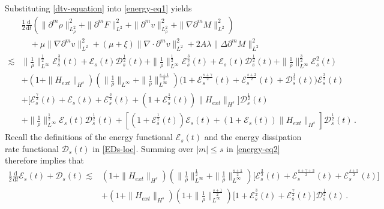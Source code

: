 \documentclass[reqno,11pt]{amsart}
\numberwithin{equation}{section}
\def\d{\mathrm{d}}
\begin{document}
Substituting \eqref{dtv-equation} into \eqref{energy-eq1} yields
\begin{equation}\label{energy-eq2}
	\begin{aligned}
	& \frac{1}{2}\frac{\d}{\d t}\left(\|\partial^m \rho\|_{L^2_\rho}^2 + \|\partial^m F\|_{L^2}^2 + \|\partial^m v\|_{L^2_\rho}^2 + \|\nabla \partial^m M\|_{L^2}^2\right) \\
& \quad + \mu \|\nabla \partial^m v\|_{L^2}^2 + (\mu + \xi) \|\nabla \cdot \partial^m v\|_{L^2}^2 + 2A\lambda \|\Delta \partial^m M\|_{L^2}^2\\
\lesssim & \|\tfrac{1}{\rho}\|^{\tfrac{1}{2}}_{L^\infty} \mathcal{E}_s^\frac{3}{2} (t) + \mathcal{E}_s (t) \mathcal{D}_s^\frac{1}{2} (t) + \|\tfrac{1}{\rho}\|^{\tfrac{1}{2}}_{L^\infty} \mathcal{E}_s^\frac{3}{2} (t) + \mathcal{E}_s (t) \mathcal{D}_s^\frac{1}{2} (t) + \| \frac{1}{\rho} \|_{L^\infty}^{\frac{3}{2}} \mathcal{E}_s^2 (t) \\
& + (1 + \| H_{ext} \|_{H^s}) ( \|\frac{1}{\rho}\|_{L^\infty} + \|\frac{1}{\rho}\|^\frac{s+1}{2}_{L^\infty} ) \big(1 + \mathcal{E}_s^\frac{s + \gamma}{ 2 } (t) + \mathcal{E}_s^\frac{s + 2}{ 2 } (t) + \mathcal{D}_s^\frac{1}{2} (t) \big) \mathcal{E}_s^\frac{3}{2} (t) \\
& + \big[ \mathcal{E}_s^\frac{\gamma}{2} (t) + \mathcal{E}_s (t) + \mathcal{E}_s^\frac{3}{2} (t) + ( 1 + \mathcal{E}_s^\frac{1}{2} (t) ) \|H_{ext}\|_{H^s} \big] \mathcal{D}_s^\frac{1}{2} (t) \\
& + \|\frac{1}{\rho}\|^{\frac{1}{2}}_{L^\infty} \mathcal{E}_s (t) \mathcal{D}_s^\frac{1}{2} (t) + \left[ ( 1 + \mathcal{E}_s^\frac{1}{2} (t) ) \mathcal{E}_s (t) + ( 1 + \mathcal{E}_s (t) ) \|H_{ext}\|_{H^s} \right] \mathcal{D}_s^\frac{1}{2} (t) \,.
	\end{aligned}
\end{equation}
Recall the definitions of the energy functional $\mathcal{E}_s(t)$ and the energy dissipation rate functional $\mathcal{D}_s(t)$ in \eqref{EDs-loc}. Summing over $|m|\leq s$ in \eqref{energy-eq2} therefore implies that
\begin{equation}\label{Ener-Bnds-Local2}
	\begin{aligned}
\frac{1}{2}\frac{\d}{\d t}	\mathcal{E}_s(t)+\mathcal{D}_s(t) \lesssim & (1 + \| H_{ext} \|_{H^s}) ( \| \tfrac{1}{\rho} \|_{L^\infty}^\frac{1}{2} + \| \tfrac{1}{\rho} \|_{L^\infty}^\frac{s+1}{2} ) \big[ \mathcal{E}_s^\frac{3}{2} (t) + \mathcal{E}_s^\frac{s + \gamma + 3}{2} (t) + \mathcal{E}_s^\frac{s+5}{2} (t) \big] \\
& + (1 + \| H_{ext} \|_{H^s}) ( 1 + \| \tfrac{1}{\rho} \|_{L^\infty}^\frac{s+1}{2} ) \big[  1 + \mathcal{E}_s^\frac{3}{2} (t) + \mathcal{E}_s^\frac{\gamma}{2} (t) \big] \mathcal{D}_s^\frac{1}{2} (t) \,.
	\end{aligned}
\end{equation}
\end{document}
